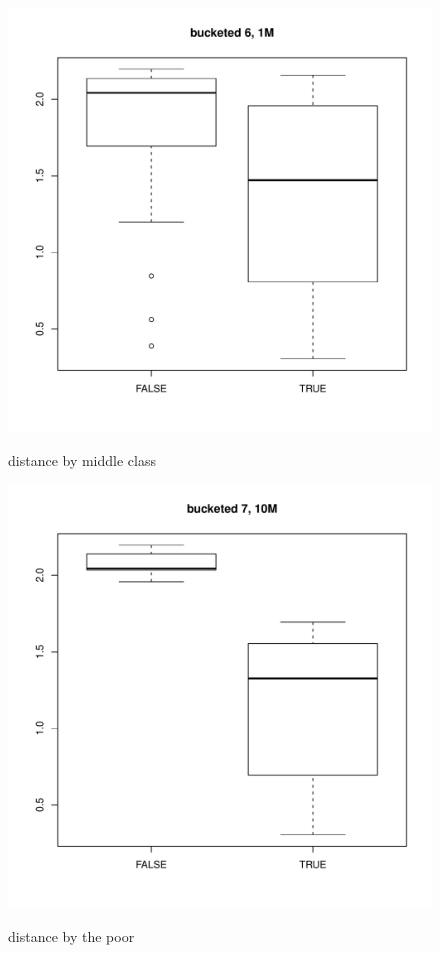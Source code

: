\documentclass[10pt,oneside]{memoir}
\begin{document}
\begin{Spacing}{2}
\begin{figure}[ht]
\bigskip

\centering
\includegraphics[scale=0.4]{figures/boxplots/boxplot-x6-cb}
\label{figure:boxplot-x6}
\caption{distance by middle class}
\endminipage\hfill%
%
\centering
\includegraphics[scale=0.4]{figures/boxplots/boxplot-x7-cb}
\label{figure:boxplot-x7}
\caption{distance by the poor}
\endminipage
\end{figure}


\end{Spacing}
\end{document}
